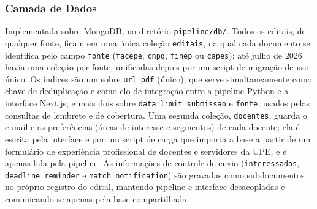 \documentclass[12pt]{article}
\begin{document}
  \subsubsection{Camada de Dados}\label{sec:camada-de-dados}
  Implementada sobre MongoDB, no diretório \texttt{pipeline/db/}. Todos os editais, de qualquer fonte, ficam em uma única coleção \texttt{editais}, na qual cada documento se identifica pelo campo \texttt{fonte} (\texttt{facepe}, \texttt{cnpq}, \texttt{finep} ou \texttt{capes}); até julho de 2026 havia uma coleção por fonte, unificadas depois por um script de migração de uso único. Os índices são um sobre \texttt{url\_pdf} (único), que serve simultaneamente como chave de deduplicação e como elo de integração entre a pipeline Python e a interface Next.js, e mais dois sobre \texttt{data\_limit\_submissao} e \texttt{fonte}, usados pelas consultas de lembrete e de cobertura. Uma segunda coleção, \texttt{docentes}, guarda o e-mail e as preferências (áreas de interesse e segmentos) de cada docente; ela é escrita pela interface e por um script de carga que importa a base a partir de um formulário de experiência profissional de docentes e servidores da UPE, e é apenas lida pela pipeline. As informações de controle de envio (\texttt{interessados}, \texttt{deadline\_reminder} e \texttt{match\_notification}) são gravadas como subdocumentos no próprio registro do edital, mantendo pipeline e interface desacopladas e comunicando-se apenas pela base compartilhada.
\end{document}
